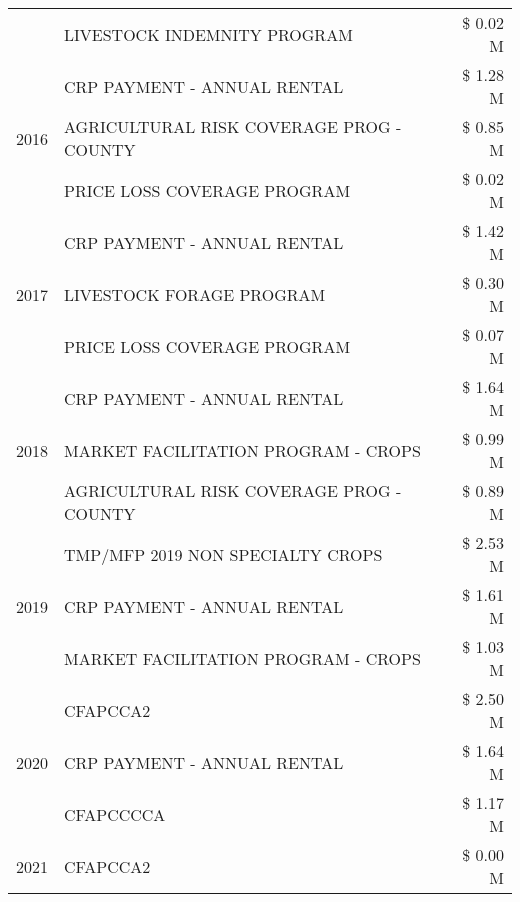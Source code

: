 \begin{tabular}{llr}
 & LIVESTOCK INDEMNITY PROGRAM & \$ 0.02 M \\
\cline{1-3}
\multirow[t]{3}{*}{2016} & CRP PAYMENT - ANNUAL RENTAL & \$ 1.28 M \\
 & AGRICULTURAL RISK COVERAGE PROG - COUNTY & \$ 0.85 M \\
 & PRICE LOSS COVERAGE PROGRAM & \$ 0.02 M \\
\cline{1-3}
\multirow[t]{3}{*}{2017} & CRP PAYMENT - ANNUAL RENTAL & \$ 1.42 M \\
 & LIVESTOCK FORAGE PROGRAM & \$ 0.30 M \\
 & PRICE LOSS COVERAGE PROGRAM & \$ 0.07 M \\
\cline{1-3}
\multirow[t]{3}{*}{2018} & CRP PAYMENT - ANNUAL RENTAL & \$ 1.64 M \\
 & MARKET FACILITATION PROGRAM - CROPS & \$ 0.99 M \\
 & AGRICULTURAL RISK COVERAGE PROG - COUNTY & \$ 0.89 M \\
\cline{1-3}
\multirow[t]{3}{*}{2019} & TMP/MFP 2019 NON SPECIALTY CROPS & \$ 2.53 M \\
 & CRP PAYMENT - ANNUAL RENTAL & \$ 1.61 M \\
 & MARKET FACILITATION PROGRAM - CROPS & \$ 1.03 M \\
\cline{1-3}
\multirow[t]{3}{*}{2020} & CFAPCCA2 & \$ 2.50 M \\
 & CRP PAYMENT - ANNUAL RENTAL & \$ 1.64 M \\
 & CFAPCCCCA & \$ 1.17 M \\
\cline{1-3}
2021 & CFAPCCA2 & \$ 0.00 M \\
\cline{1-3}
\bottomrule
\end{tabular}
